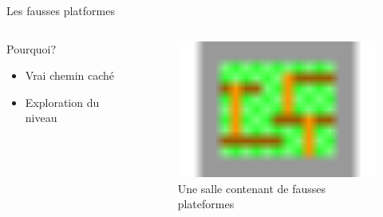 \documentclass{beamer}
\begin{document}
{\begin{frame}{Les fausses platformes}
    \begin{columns}
        \begin{block}{Pourquoi?}
            \begin{itemize}
                \item[\bullet] Vrai chemin caché
                \item[\bullet] Exploration du niveau
            \end{itemize}
        \end{block}
        \begin{figure}
            \centering
            \includegraphics[width=1.0\textwidth]{fake_platforms}
            \caption{Une salle contenant de fausses plateformes}
        \end{figure}
    \end{columns}
\end{frame}

}
\end{document}
